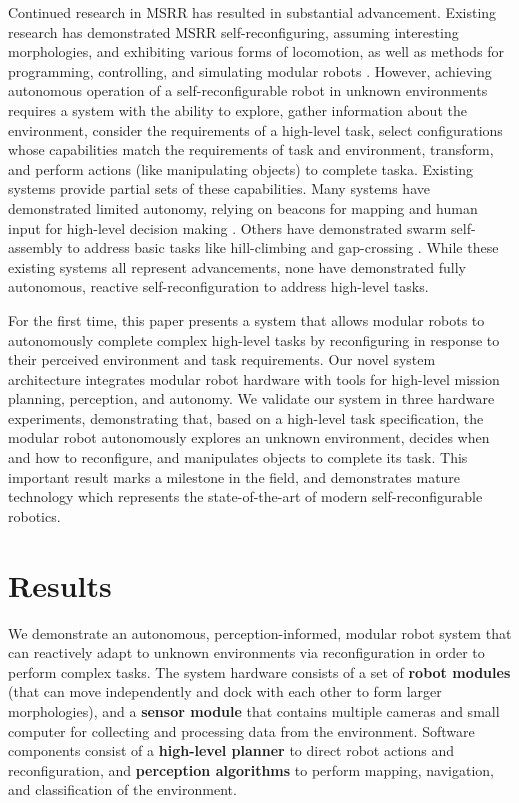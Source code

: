 \documentclass[12pt]{article}
\begin{document}
Continued research in  MSRR has resulted in substantial advancement.  Existing research has demonstrated MSRR self-reconfiguring, assuming interesting morphologies, and exhibiting various forms of locomotion, as well as methods for programming, controlling, and simulating modular robots \cite{Yim2007, Rubenstein2004,Murata2006,Paulos2015,Yim1994,Jing2016}.
However, achieving autonomous operation of a self-reconfigurable robot in unknown environments requires a system with the ability to explore, gather information about the environment, consider the requirements of a high-level task, select configurations whose capabilities match the requirements of task and environment, transform, and perform actions (like manipulating objects) to complete taska.  Existing systems provide partial sets of these capabilities.
Many systems have demonstrated limited autonomy, relying on beacons for mapping  \cite{Grabowski2000,Dorigo2005} and human input for high-level decision making \cite{Mondada2005,Dorigo2013}. Others have demonstrated swarm self-assembly to address basic tasks like hill-climbing and gap-crossing \cite{gross2006autonomous,o2010self}.  While these existing systems all represent advancements, none have demonstrated fully autonomous, reactive self-reconfiguration to address high-level tasks.

For the first time, this paper presents a system that allows modular robots to autonomously complete complex high-level tasks by reconfiguring in response to their perceived environment and task requirements.  Our novel system architecture integrates modular robot hardware with tools for high-level mission planning, perception, and autonomy.  
We validate our system in three hardware experiments, demonstrating that, based on a high-level task specification, the modular robot autonomously explores an unknown environment, decides when and how to reconfigure, and manipulates objects to complete its task.  This important  result marks a milestone in the field, and demonstrates mature technology which represents the state-of-the-art of modern self-reconfigurable robotics.


\section{Results}
\label{sec:results}
%
We demonstrate an autonomous, perception-informed, modular robot system that can reactively adapt to unknown environments via reconfiguration in order to perform complex tasks. The system hardware consists of a set of \textbf{robot modules} (that can move independently and dock with each other to form larger morphologies), and a \textbf{sensor module} that contains multiple cameras and small computer for collecting and processing data from the environment. Software components consist of a \textbf{high-level planner} to direct robot actions and reconfiguration, and \textbf{perception algorithms} to perform mapping, navigation, and classification of the environment.
\end{document}
